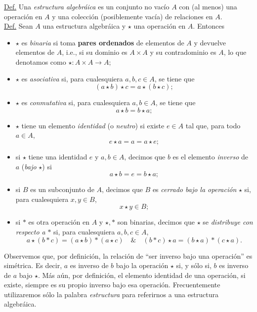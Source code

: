 \documentclass[apuntes]{subfiles}
\begin{document}
\begin{tcolorbox}
    \underline{Def.} Una \emph{estructura algebráica} es un conjunto no vacío $A$ con (al menos) una operación en $A$ y una colección (posiblemente vacía) de relaciones en $A$. \\

    \underline{Def.} Sean $A$ una estructura algebráica y $\star$ una operación en $A$. Entonces

    \begin{itemize}
        \item $\star$ es \emph{binaria} si toma \textbf{pares ordenados} de elementos de $A$ y devuelve elementos de $A$, i.e., si su dominio es $A\times A$ y su contradominio es $A$, lo que denotamos como $\star:A\times A\to A$;

        \item $\star$ es \emph{asociativa} si, para cualesquiera $a,b,c\in A$, se tiene que $$(a\star b)\star c = a\star(b\star c);$$

        \item $\star$ es \emph{conmutativa} si, para cualesquiera $a,b\in A$, se tiene que $$a\star b = b\star a;$$

        \item $\star$ tiene un elemento \emph{identidad} (o \emph{neutro}) si existe $e\in A$ tal que, para todo $a\in A$, $$e\star a = a = a\star e;$$

        \item si $\star$ tiene una identidad $e$ y $a,b\in A$, decimos que $b$ es el elemento \emph{inverso} de $a$ (\emph{bajo} $\star$) si $$a\star b = e = b\star a;$$

        \item si $B$ es un subconjunto de $A$, decimos que $B$ es \emph{cerrado bajo la operación} $\star$ si, para cualesquiera $x,y\in B$, $$x\star y\in B;$$

        \item si $\ast$ es otra operación en $A$ y $\star,\ast$ son binarias, decimos que $\star$ se \emph{distribuye con respecto a} $\ast$ si, para cualesquiera $a,b,c\in A$, $$a\star(b\ast c) = (a\star b)\ast(a\star c) \quad \& \quad (b\ast c)\star a = (b\star a)\ast(c\star a).$$
    \end{itemize}
\end{tcolorbox}
    
Observemos que, por definición, la relación de ``ser inverso bajo una operación'' es simétrica. Es decir, $a$ es inverso de $b$ bajo la operación $\star$ si, y sólo si, $b$ es inverso de $a$ bajo $\star$. Más aún, por definición, el elemento identidad de una operación, si existe, siempre es su propio inverso bajo esa operación. Frecuentemente utilizaremos sólo la palabra \emph{estructura} para referirnos a una estructura algebráica. 
\end{document}
